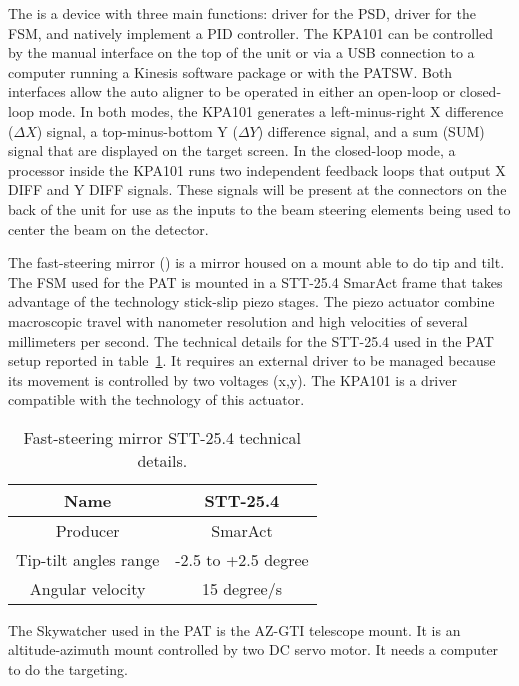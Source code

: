 The  is a device with three main functions: driver for the PSD, driver for the FSM, and natively implement a PID controller.
The KPA101 can be controlled by the manual interface on the top of the unit or via a USB connection to a computer running a Kinesis software package or with the PATSW. Both interfaces allow the auto aligner to be operated in either an open-loop or closed-loop mode. In both modes, the KPA101 generates a left-minus-right X difference ($\Delta X$) signal, a top-minus-bottom Y ($\Delta Y$) difference signal, and a sum (SUM) signal that are displayed on the target screen. In the closed-loop mode, a processor inside the KPA101 runs two independent feedback loops that output X DIFF and Y DIFF signals. These signals will be present at the connectors on the back of the unit for use as the inputs to the beam steering elements being used to center the beam on the detector.

The fast-steering mirror () is a mirror housed on a mount able to do tip and tilt.
The FSM used for the PAT is mounted in a STT-25.4 SmarAct frame that takes advantage of the technology stick-slip piezo stages. The piezo actuator combine macroscopic travel with nanometer resolution and high velocities of several millimeters per second. The technical details for the STT-25.4 used in the PAT setup reported in table~\ref{table:3}.
It requires an external driver to be managed because its movement is controlled by two voltages (x,y). The KPA101 is a driver compatible with the technology of this actuator.

\begin{table}[h!]
      \centering
      \begin{tabular}{ |c|c| }
            \hline
            Name                  & STT-25.4            \\\hline
            Producer              & SmarAct             \\\hline
            Tip-tilt angles range & -2.5 to +2.5 degree \\\hline
            Angular velocity      & 15 degree/s         \\\hline
      \end{tabular}
      \caption{Fast-steering mirror STT-25.4 technical details.}
      \label{table:3}
\end{table}

The Skywatcher used in the PAT is the AZ-GTI telescope mount. It is an altitude-azimuth mount controlled by two DC servo motor. It needs a computer to do the targeting.

